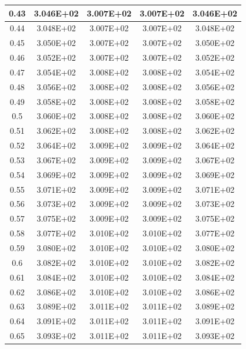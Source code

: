 \documentclass{article}
\begin{document}
\begin{center}
\begin{longtable}{|c|c|c|c|c|}
            0.43 & 3.046E+02 & 3.007E+02 & 3.007E+02 & 3.046E+02 \\ \hline
            0.44 & 3.048E+02 & 3.007E+02 & 3.007E+02 & 3.048E+02 \\ \hline
            0.45 & 3.050E+02 & 3.007E+02 & 3.007E+02 & 3.050E+02 \\ \hline
            0.46 & 3.052E+02 & 3.007E+02 & 3.007E+02 & 3.052E+02 \\ \hline
            0.47 & 3.054E+02 & 3.008E+02 & 3.008E+02 & 3.054E+02 \\ \hline
            0.48 & 3.056E+02 & 3.008E+02 & 3.008E+02 & 3.056E+02 \\ \hline
            0.49 & 3.058E+02 & 3.008E+02 & 3.008E+02 & 3.058E+02 \\ \hline
            0.5 & 3.060E+02 & 3.008E+02 & 3.008E+02 & 3.060E+02 \\ \hline
            0.51 & 3.062E+02 & 3.008E+02 & 3.008E+02 & 3.062E+02 \\ \hline
            0.52 & 3.064E+02 & 3.009E+02 & 3.009E+02 & 3.064E+02 \\ \hline
            0.53 & 3.067E+02 & 3.009E+02 & 3.009E+02 & 3.067E+02 \\ \hline
            0.54 & 3.069E+02 & 3.009E+02 & 3.009E+02 & 3.069E+02 \\ \hline
            0.55 & 3.071E+02 & 3.009E+02 & 3.009E+02 & 3.071E+02 \\ \hline
            0.56 & 3.073E+02 & 3.009E+02 & 3.009E+02 & 3.073E+02 \\ \hline
            0.57 & 3.075E+02 & 3.009E+02 & 3.009E+02 & 3.075E+02 \\ \hline
            0.58 & 3.077E+02 & 3.010E+02 & 3.010E+02 & 3.077E+02 \\ \hline
            0.59 & 3.080E+02 & 3.010E+02 & 3.010E+02 & 3.080E+02 \\ \hline
            0.6 & 3.082E+02 & 3.010E+02 & 3.010E+02 & 3.082E+02 \\ \hline
            0.61 & 3.084E+02 & 3.010E+02 & 3.010E+02 & 3.084E+02 \\ \hline
            0.62 & 3.086E+02 & 3.010E+02 & 3.010E+02 & 3.086E+02 \\ \hline
            0.63 & 3.089E+02 & 3.011E+02 & 3.011E+02 & 3.089E+02 \\ \hline
            0.64 & 3.091E+02 & 3.011E+02 & 3.011E+02 & 3.091E+02 \\ \hline
            0.65 & 3.093E+02 & 3.011E+02 & 3.011E+02 & 3.093E+02 \\ \hline

\end{longtable}
\end{center}
\end{document}

